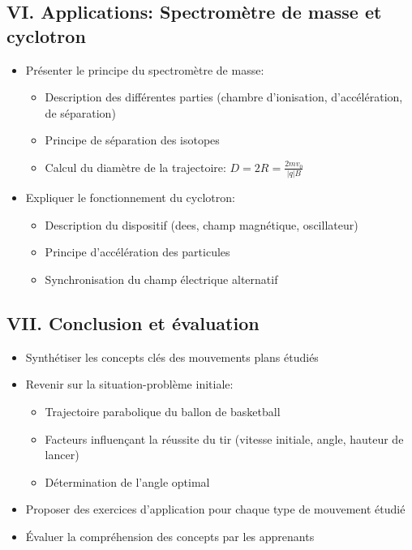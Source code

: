 \documentclass[12pt]{article}
\begin{document}
\subsection*{VI. Applications: Spectromètre de masse et cyclotron}

\begin{itemize}
    \item Présenter le principe du spectromètre de masse:
    \begin{itemize}
        \item Description des différentes parties (chambre d'ionisation, d'accélération, de séparation)
        \item Principe de séparation des isotopes
        \item Calcul du diamètre de la trajectoire: $D = 2R = \frac{2mv_0}{|q|B}$
    \end{itemize}
    \item Expliquer le fonctionnement du cyclotron:
    \begin{itemize}
        \item Description du dispositif (dees, champ magnétique, oscillateur)
        \item Principe d'accélération des particules
        \item Synchronisation du champ électrique alternatif
    \end{itemize}
\end{itemize}

\subsection*{VII. Conclusion et évaluation}

\begin{itemize}
    \item Synthétiser les concepts clés des mouvements plans étudiés
    \item Revenir sur la situation-problème initiale:
    \begin{itemize}
        \item Trajectoire parabolique du ballon de basketball
        \item Facteurs influençant la réussite du tir (vitesse initiale, angle, hauteur de lancer)
        \item Détermination de l'angle optimal
    \end{itemize}
    \item Proposer des exercices d'application pour chaque type de mouvement étudié
    \item Évaluer la compréhension des concepts par les apprenants
\end{itemize}
\end{document}
